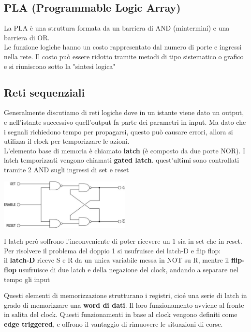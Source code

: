 \documentclass[12pt, a4paper]{article}
\begin{document}
\subsection{PLA (Programmable Logic Array)}
La PLA è una struttura formata da un barriera di AND (mintermini) e una barriera di OR.\\
Le funzione logiche hanno un costo rappresentato dal numero di porte e ingressi nella rete. 
Il costo può essere ridotto tramite metodi di tipo sistematico o grafico e si riuniscono sotto la "sintesi logica" 

\newpage
\subsection{Reti sequenziali}
Generalmente discutiamo di reti logiche dove in un istante viene dato un output, e nell'istante successivo
quell'output fa parte dei parametri in input. Ma dato che  i segnali richiedono tempo per propagarsi, questo
può causare errori, allora si utilizza il clock per temporizzare le azioni.\\
L'elemento base di memoria è chiamato \textbf{latch} (è composto da due porte NOR). I latch temporizzati vengono chiamati
\textbf{gated latch}. quest'ultimi sono controllati tramite 2 AND sugli ingressi di set e reset 

\begin{center}
  \includegraphics[width=250px]{images/gatedLatch.jpg}
\end{center}

I latch però soffrono l'inconveniente di poter ricevere un 1 sia in set che in reset. Per risolvere il problema del 
doppio 1 si usufruisce dei latch-D e flip flop:\\
il \textbf{latch-D} riceve S e R da un unica variabile messa in NOT su R, mentre il \textbf{flip-flop} usufruisce
di due latch e della negazione del clock, andando a separare nel tempo gli input

Questi elementi di memorizzazione strutturano i registri, cioé una serie di latch in grado di memorizzare una
\textbf{word di dati}. Il loro funzionamento avviene al fronte in salita del clock. Questi funzionamenti in base 
al clock vengono definiti come \textbf{edge triggered}, e offrono il vantaggio di rimuovere le situazioni di corse.
\end{document}
